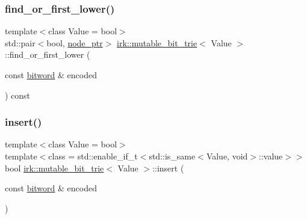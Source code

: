 \subsubsection{\texorpdfstring{find\+\_\+or\+\_\+first\+\_\+lower()}{find\_or\_first\_lower()}}
{\footnotesize\ttfamily template$<$class Value = bool$>$ \\
std\+::pair$<$bool, \mbox{\hyperlink{classirk_1_1mutable__bit__trie_abd23179ac4f02a981d4f47b4c0652287}{node\+\_\+ptr}}$>$ \mbox{\hyperlink{classirk_1_1mutable__bit__trie}{irk\+::mutable\+\_\+bit\+\_\+trie}}$<$ Value $>$\+::find\+\_\+or\+\_\+first\+\_\+lower (\begin{DoxyParamCaption}\item[{const \mbox{\hyperlink{namespaceirk_a979e09720c2ef05573819388a3c0e79a}{bitword}} \&}]{encoded }\end{DoxyParamCaption}) const\hspace{0.3cm}{\ttfamily [inline]}}

\mbox{\label{classirk_1_1mutable__bit__trie_ab502e5df64f1e9fd767e2963f210334b}} 
\subsubsection{\texorpdfstring{insert()}{insert()}\hspace{0.1cm}{\footnotesize\ttfamily [1/2]}}
{\footnotesize\ttfamily template$<$class Value = bool$>$ \\
template$<$class  = std\+::enable\+\_\+if\+\_\+t$<$std\+::is\+\_\+same$<$\+Value, void$>$\+::value$>$$>$ \\
bool \mbox{\hyperlink{classirk_1_1mutable__bit__trie}{irk\+::mutable\+\_\+bit\+\_\+trie}}$<$ Value $>$\+::insert (\begin{DoxyParamCaption}\item[{const \mbox{\hyperlink{namespaceirk_a979e09720c2ef05573819388a3c0e79a}{bitword}} \&}]{encoded }\end{DoxyParamCaption})\hspace{0.3cm}{\ttfamily [inline]}}

\mbox{\label{classirk_1_1mutable__bit__trie_a694f1825422ce94a786bc922baef651d}} 

